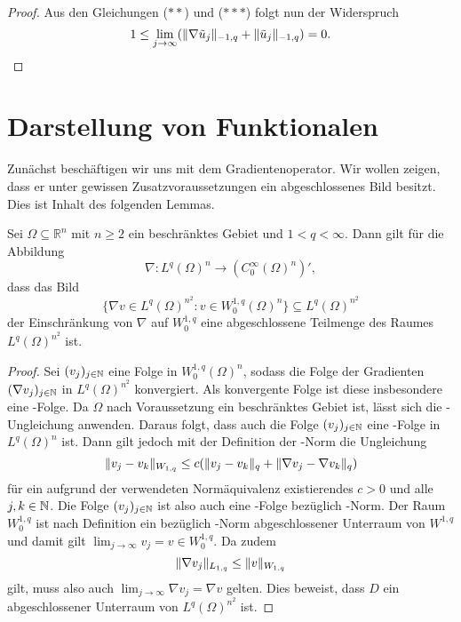 \begin{proof}
  Aus den Gleichungen ($\ast\ast$) und ($\ast\ast\ast$) folgt nun der Widerspruch
  \begin{displaymath}
  1 \leq \lim_{j \to \infty} ( \lVert \nabla \tilde u_j  \rVert_{-1,q} + \lVert \tilde u_j \rVert_{-1,q} ) = 0.\qedhere
  \end{displaymath}
  

\end{proof}

\section{Darstellung von Funktionalen}

Zunächst beschäftigen wir uns mit dem Gradientenoperator.
Wir wollen zeigen, dass er unter gewissen Zusatzvoraussetzungen ein abgeschlossenes Bild besitzt.
Dies ist Inhalt des folgenden Lemmas.

\begin{lem}
  \label{lem:closedImageGradient}
  Sei $\Omega \subseteq \mathbb{R}^n$ mit $n \geq 2$ ein beschränktes Gebiet und $1 < q < \infty$.
  Dann gilt für die Abbildung
  $$
  \nabla \colon L^{q}(\Omega)^{n} \to (C_0^\infty(\Omega)^n)',
  $$
  dass das Bild
  $$
  \{\nabla v \in L^{q}(\Omega)^{n^2} \colon v \in W_0^{1,q}(\Omega)^n\} \subseteq L^{q}(\Omega)^{n^2}
  $$
  der Einschränkung von $\nabla$ auf $W_0^{1,q}$ eine abgeschlossene Teilmenge des Raumes $L^q(\Omega)^{n^2}$ ist.
\end{lem}

\begin{proof}
  Sei $(v_j)_{j \in \mathbb{N}}$ eine Folge in $W_0^{1,q}(\Omega)^n$, sodass die Folge der Gradienten $(\nabla v_j)_{j \in \mathbb{N}}$ in $L^q(\Omega)^{n^2}$ konvergiert.
  Als konvergente Folge ist diese insbesondere eine \cauchy\hyp{}Folge.
  Da $\Omega$ nach Voraussetzung ein beschränktes Gebiet ist, lässt sich die \poincare\hyp{}Ungleichung anwenden.
  Daraus folgt, dass auch die Folge $(v_j)_{j \in \mathbb{N}}$ eine \cauchy\hyp{}Folge in $L^q(\Omega)^n$ ist.
  Dann gilt jedoch mit der Definition der \sobolev\hyp{}Norm die Ungleichung
  $$
  \lVert v_j - v_k \rVert_{W_{1,q}} \leq c (\lVert v_j - v_k \rVert_q + \lVert \nabla v_j - \nabla v_k \rVert_q)
  $$
  für ein aufgrund der verwendeten Normäquivalenz existierendes $c > 0$ und alle $j,k \in \mathbb{N}$.
  Die Folge $(v_j)_{j \in \mathbb{N}}$ ist also auch eine \cauchy\hyp{}Folge bezüglich \sobolev\hyp{}Norm.
  Der Raum $W_0^{1,q}$ ist nach Definition ein bezüglich \sobolev\hyp{}Norm abgeschlossener Unterraum von $W^{1,q}$ und damit gilt $\lim_{j \to \infty} v_j = v \in W_0^{1,q}$.
  Da zudem
  $$
  \lVert \nabla v_j \rVert_{L_{1,q}} \leq \lVert v \rVert_{W_{1,q}}  
  $$
  gilt, muss also auch $\lim_{j \to \infty} \nabla v_j = \nabla v$ gelten.
  Dies beweist, dass $D$ ein abgeschlossener Unterraum von $L^q(\Omega)^{n^2}$ ist.
\end{proof}

